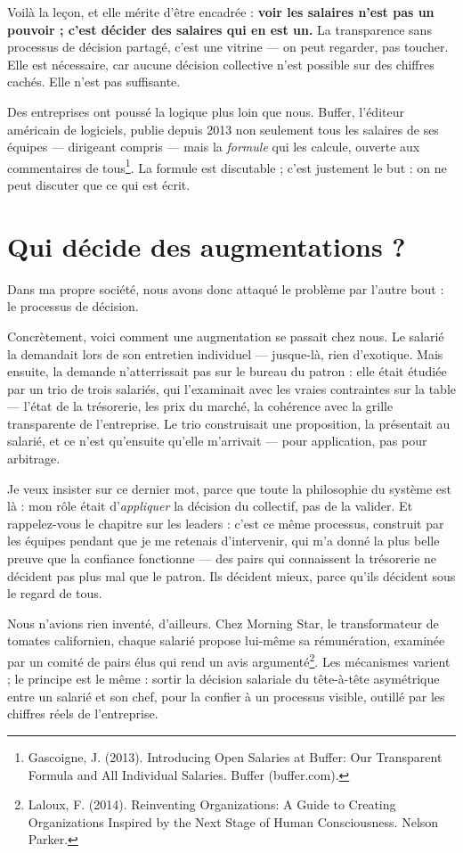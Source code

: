 Voilà la leçon, et elle mérite d'être encadrée : \textbf{voir les salaires n'est pas un pouvoir ; c'est décider des salaires qui en est un.} La transparence sans processus de décision partagé, c'est une vitrine — on peut regarder, pas toucher. Elle est nécessaire, car aucune décision collective n'est possible sur des chiffres cachés. Elle n'est pas suffisante.

Des entreprises ont poussé la logique plus loin que nous. Buffer, l'éditeur américain de logiciels, publie depuis 2013 non seulement tous les salaires de ses équipes — dirigeant compris — mais la \emph{formule} qui les calcule, ouverte aux commentaires de tous\footnote{Gascoigne, J. (2013). Introducing Open Salaries at Buffer: Our Transparent Formula and All Individual Salaries. Buffer (buffer.com).}. La formule est discutable ; c'est justement le but : on ne peut discuter que ce qui est écrit.

\section{Qui décide des augmentations ?}

Dans ma propre société, nous avons donc attaqué le problème par l'autre bout : le processus de décision.

Concrètement, voici comment une augmentation se passait chez nous. Le salarié la demandait lors de son entretien individuel — jusque-là, rien d'exotique. Mais ensuite, la demande n'atterrissait pas sur le bureau du patron : elle était étudiée par un trio de trois salariés, qui l'examinait avec les vraies contraintes sur la table — l'état de la trésorerie, les prix du marché, la cohérence avec la grille transparente de l'entreprise. Le trio construisait une proposition, la présentait au salarié, et ce n'est qu'ensuite qu'elle m'arrivait — pour application, pas pour arbitrage.

Je veux insister sur ce dernier mot, parce que toute la philosophie du système est là : mon rôle était d'\emph{appliquer} la décision du collectif, pas de la valider. Et rappelez-vous le chapitre sur les leaders : c'est ce même processus, construit par les équipes pendant que je me retenais d'intervenir, qui m'a donné la plus belle preuve que la confiance fonctionne — des pairs qui connaissent la trésorerie ne décident pas plus mal que le patron. Ils décident mieux, parce qu'ils décident sous le regard de tous.

Nous n'avions rien inventé, d'ailleurs. Chez Morning Star, le transformateur de tomates californien, chaque salarié propose lui-même sa rémunération, examinée par un comité de pairs élus qui rend un avis argumenté\footnote{Laloux, F. (2014). Reinventing Organizations: A Guide to Creating Organizations Inspired by the Next Stage of Human Consciousness. Nelson Parker.}. Les mécanismes varient ; le principe est le même : sortir la décision salariale du tête-à-tête asymétrique entre un salarié et son chef, pour la confier à un processus visible, outillé par les chiffres réels de l'entreprise.

